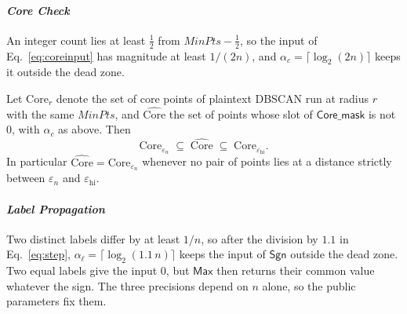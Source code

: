 \paragraph{\emph{Core Check}}
An integer count lies at least $\tfrac{1}{2}$ from
$\mathit{MinPts} - \tfrac{1}{2}$, so the input of
Eq.~\eqref{eq:coreinput} has magnitude at least $1/(2n)$, and
$\alpha_c = \lceil \log_2 (2n) \rceil$ keeps it outside the dead zone.

\begin{theorem}
\label{thm:sandwich}
Let $\mathrm{Core}_r$ denote the set of core points of plaintext DBSCAN
run at radius $r$ with the same $\mathit{MinPts}$, and
$\widehat{\mathrm{Core}}$ the set of points whose slot of
$\mathsf{Core\_mask}$ is not $0$, with $\alpha_c$ as above. Then
\[
  \mathrm{Core}_{\varepsilon_n} \;\subseteq\;
  \widehat{\mathrm{Core}} \;\subseteq\;
  \mathrm{Core}_{\varepsilon_{\mathrm{hi}}} .
\]
In particular $\widehat{\mathrm{Core}} = \mathrm{Core}_{\varepsilon_n}$
whenever no pair of points lies at a distance strictly between
$\varepsilon_n$ and $\varepsilon_{\mathrm{hi}}$.
\end{theorem}

\paragraph{\emph{Label Propagation}}
Two distinct labels differ by at least $1/n$, so after the division by
$1.1$ in Eq.~\eqref{eq:step}, $\alpha_\ell = \lceil \log_2 (1.1\,n) \rceil$
keeps the input of $\mathsf{Sgn}$ outside the dead zone. Two equal labels
give the input $0$, but $\mathsf{Max}$ then returns their common value
whatever the sign. The three precisions depend on $n$ alone, so the
public parameters fix them.
